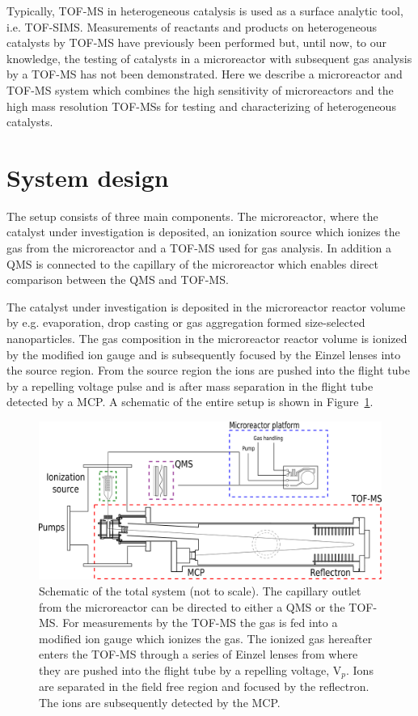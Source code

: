 \documentclass[aip,rsi]{revtex4-1}
\begin{document}
Typically, TOF-MS in heterogeneous catalysis is used as a surface analytic tool, i.e. TOF-SIMS\cite{Benninghoven1994,DeSmet1998,Grams2004,Johnson2010}. Measurements of reactants and products on heterogeneous catalysts by TOF-MS have previously been performed\cite{Levy1963,Okumura2007} but, until now, to our knowledge, the testing of catalysts in a microreactor with subsequent gas analysis by a TOF-MS has not been demonstrated. Here we describe a microreactor and TOF-MS system which combines the high sensitivity of microreactors and the high mass resolution TOF-MSs for testing and characterizing of heterogeneous catalysts.

\section{System design}
The setup consists of three main components. The microreactor, where the catalyst under investigation is deposited, an ionization source which ionizes the gas from the microreactor and a TOF-MS used for gas analysis. In addition a QMS is connected to the capillary of the microreactor which enables direct comparison between the QMS and TOF-MS.

The catalyst under investigation is deposited in the microreactor reactor volume by e.g. evaporation\cite{Henriksen2009}, drop casting\cite{Vesborg2010} or gas aggregation formed size-selected nanoparticles. The gas composition in the microreactor reactor volume is ionized by the modified ion gauge  and is subsequently focused by the Einzel lenses into the source region. From the source region the ions are pushed into the flight tube by a repelling voltage pulse and is after mass separation in the flight tube detected by a MCP. A schematic of the entire setup is shown in Figure~\ref{fig:TOF_microreactor}.
\begin{figure}
 \includegraphics[width=17cm]{TOF_microreactor.png}%
 \caption{Schematic of the total system (not to scale). The capillary outlet from the microreactor can be directed to either a QMS or the TOF-MS. For measurements by the TOF-MS the gas is fed into a modified ion gauge which ionizes the gas. The ionized gas hereafter enters the TOF-MS through a series of Einzel lenses from where they are pushed into the flight tube by a repelling voltage, V$_p$. Ions are separated in the field free region and focused by the reflectron. The ions are subsequently detected by the MCP.\label{fig:TOF_microreactor}}%
\end{figure}
\end{document}
